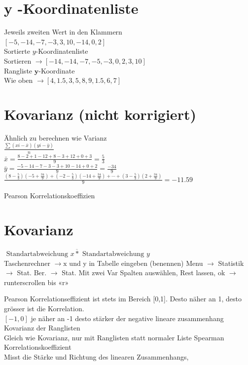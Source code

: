 \documentclass[10pt]{article}
\begin{document}
\section*{y -Koordinatenliste}
Jeweils zweiten Wert in den Klammern\\
$[-5,-14,-7,-3,3,10,-14,0,2]$\\
Sortierte $y$-Koordinatenliste\\
Sortieren $\rightarrow[-14,-14,-7,-5,-3,0,2,3,10]$\\
Rangliste $\boldsymbol{y}$-Koordinate\\
Wie oben $\rightarrow[4,1.5,3,5,8,9,1.5,6,7]$

\section*{Kovarianz (nicht korrigiert)}
Ähnlich zu berechnen wie Varianz\\
$\frac{\sum(x i-\bar{x})(y i-\bar{y})}{n}$\\
$\bar{x}=\frac{8-2+1-12+8-3+12+0+3}{9}=\frac{5}{3}$\\
$\bar{y}=\frac{-5-14-7-3-3+10-14+0+2}{9}=\frac{-34}{9}$\\
$\frac{\left(8-\frac{5}{3}\right)\left(-5+\frac{34}{9}\right)+\left(-2-\frac{5}{3}\right)\left(-14+\frac{34}{9}\right)+\cdots+\left(3-\frac{5}{3}\right)\left(2+\frac{34}{9}\right)}{9}=-11.59$

Pearson Korrelationskoeffizien

\section*{Kovarianz}
$\overline{\text { Standartabweichung } x * \text { Standartabweichung } y}$\\
Taschenrechner $\rightarrow \mathrm{x}$ und y in Tabelle eingeben (benennen) Menu $\rightarrow$ Statistik $\rightarrow$ Stat. Ber. $\rightarrow$ Stat. Mit zwei Var Spalten auswählen, Rest lassen, ok $\rightarrow$ runterscrollen bis «r»

Pearson Korrelationseffizient ist stets im Bereich [0,1]. Desto näher an 1, desto grösser ist die Korrelation.\\
$[-1,0]$ je näher an -1 desto stärker der negative lineare zusammenhang\\
Kovarianz der Ranglisten\\
Gleich wie Kovarianz, nur mit Ranglisten statt normaler Liste Spearman Korrelationskoeffizient\\
Misst die Stärke und Richtung des linearen Zusammenhangs,
\end{document}
